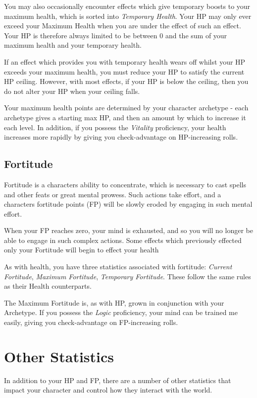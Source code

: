 You may also occasionally encounter effects which give temporary boosts to your maximum health, which is sorted into {\it Temporary Health}. Your HP may only ever exceed your Maximum Health when you are under the effect of such an effect.
Your HP is therefore always limited to be between 0 and the sum of your maximum health and your temporary health. 

If an effect which provides you with temporary health wears off whilst your HP exceeds your maximum health, you must reduce your HP to satisfy the current HP ceiling. However, with most effects, if your HP is below the ceiling, then you do not alter your HP when your ceiling falls. 

Your maximum health points are determined by your character archetype - each archetype gives a starting max HP, and then an amount by which to increase it each level. In addition, if you possess the {\it Vitality} proficiency, your health increases more rapidly by giving you check-advantage on HP-increasing rolls.

\subsection*{Fortitude}

Fortitude is a character{\apos}s ability to concentrate, which is necessary to cast spells and other feats or great mental prowess. Such actions take effort, and a character{\apos}s fortitude points (FP) will be slowly eroded by engaging in such mental effort.  

When your FP reaches zero, your mind is exhausted, and so you will no longer be able to engage in such complex actions. Some effects which previously effected only your Fortitude will begin to effect your health

As with health, you have three statistics associated with fortitude: {\it Current Fortitude}, {\it Maximum Fortitude}, {\it Temporary Fortitude}. These follow the same rules as their Health counterparts. 

The Maximum Fortitude is, as with HP, grown in conjunction with your Archetype. If you possess the {\it Logic} proficiency, your mind can be trained me easily, giving you check-advantage on FP-increasing rolls.


\section{Other Statistics}

In addition to your HP and FP, there are a number of other statistics that impact your character and control how they interact with the world. 


